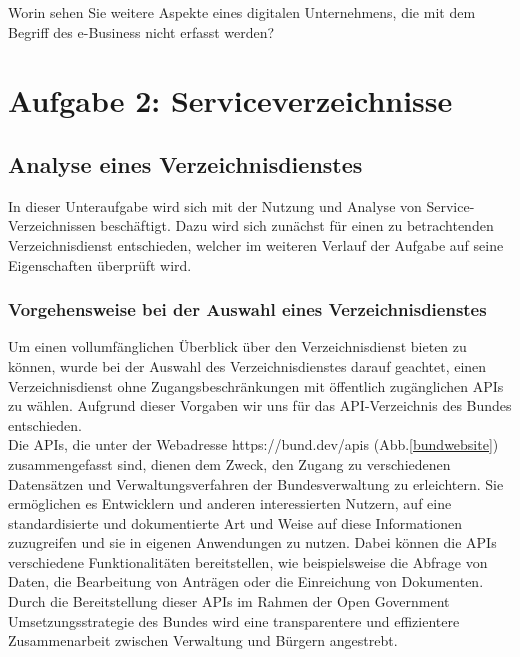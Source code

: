 \documentclass[notitlepage, hidelinks]{article}
\begin{document}
Worin sehen Sie weitere Aspekte eines digitalen Unternehmens, die mit dem Begriff des e-Business nicht erfasst werden?

\newpage

\section{Aufgabe 2: Serviceverzeichnisse}
\subsection{Analyse eines Verzeichnisdienstes}

In dieser Unteraufgabe wird sich mit der Nutzung und Analyse von Service-Verzeichnissen beschäftigt. Dazu wird sich zunächst für einen zu betrachtenden Verzeichnisdienst entschieden, welcher im weiteren Verlauf der Aufgabe auf seine Eigenschaften überprüft wird.

\subsubsection{Vorgehensweise bei der Auswahl eines Verzeichnisdienstes}
Um einen vollumfänglichen Überblick über den Verzeichnisdienst bieten zu können, wurde bei der Auswahl des Verzeichnisdienstes darauf geachtet, einen Verzeichnisdienst ohne Zugangsbeschränkungen mit öffentlich zugänglichen APIs zu wählen. Aufgrund dieser Vorgaben wir uns für das API-Verzeichnis des Bundes entschieden. \\
Die APIs, die unter der Webadresse https://bund.dev/apis (Abb.\ref{bundwebsite}) zusammengefasst sind, dienen dem Zweck, den Zugang zu verschiedenen Datensätzen und Verwaltungsverfahren der Bundesverwaltung zu erleichtern. Sie ermöglichen es Entwicklern und anderen interessierten Nutzern, auf eine standardisierte und dokumentierte Art und Weise auf diese Informationen zuzugreifen und sie in eigenen Anwendungen zu nutzen. Dabei können die APIs verschiedene Funktionalitäten bereitstellen, wie beispielsweise die Abfrage von Daten, die Bearbeitung von Anträgen oder die Einreichung von Dokumenten. Durch die Bereitstellung dieser APIs im Rahmen der Open Government Umsetzungsstrategie des Bundes wird eine transparentere und effizientere Zusammenarbeit zwischen Verwaltung und Bürgern angestrebt. 
\end{document}
